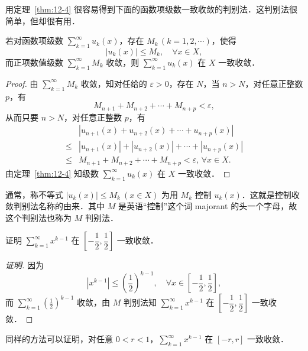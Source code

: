 用定理~\ref{thm:12-4} 很容易得到下面的函数项级数一致收敛的判别法．这判别法很简单，但却很有用．

\begin{theorem}\label{thm:12-6}
若对函数项级数 $\displaystyle\sum_{k=1}^{\infty}u_{k}(x)$，存在 $M_{k}\,(k=1,2,\cdots)$，使得
\[
\left|u_{k}(x)\right|\leqslant M_{k},\quad\forall x\in X,
\]
而正项数值级数 $\displaystyle\sum_{k=1}^{\infty}M_{k}$ 收敛，则 $\displaystyle\sum_{k=1}^{\infty}u_{k}(x)$ 在 $X$ 一致收敛．
\end{theorem}

\begin{proof}
由 $\displaystyle\sum_{k=1}^{\infty}M_{k}$ 收敛，知对任给的 $\varepsilon>0$，存在 $N$，当 $n>N$，对任意正整数 $p$，有
\[
M_{n+1}+M_{n+2}+\cdots+M_{n+p}<\varepsilon,
\]
从而只要 $n>N$，对任意正整数 $p$，有
\[
\begin{aligned}
&\left|u_{n+1}(x)+u_{n+2}(x)+\cdots+u_{n+p}(x)\right|\\
\leqslant{}&\left|u_{n+1}(x)\right|+\left|u_{n+2}(x)\right|+\cdots+\left|u_{n+p}(x)\right|\\
\leqslant{}&M_{n+1}+M_{n+2}+\cdots+M_{n+p}<\varepsilon,\,\forall x\in X.
\end{aligned}
\]
由定理~\ref{thm:12-4} 知级数 $\displaystyle\sum_{k=1}^{\infty}u_{k}(x)$ 在 $X$ 一致收敛．
\end{proof}

通常，称不等式 $\left|u_{k}(x)\right|\leqslant M_{k}\ (x\in X)$ 为用 $M_{k}$ 控制 $u_{k}(x)$．这就是控制收敛判别法名称的由来．其中 $M$ 是英语``控制''这个词 majorant 的头一个字母，故这个判别法也称为 $M$ 判别法．

\begin{example}\label{ex:12-2-6}
证明 $\displaystyle\sum_{k=1}^{\infty}x^{k-1}$ 在 $\left[-\dfrac{1}{2},\dfrac{1}{2}\right]$ 一致收敛．
\end{example}

\begin{proof}[证明]
因为
\[
\left|x^{k-1}\right|\leqslant\left(\frac{1}{2}\right)^{k-1},\quad\forall x\in\left[-\frac{1}{2},\frac{1}{2}\right],
\]
而 $\displaystyle\sum_{k=1}^{\infty}\left(\frac{1}{2}\right)^{k-1}$ 收敛，由 $M$ 判别法知 $\displaystyle\sum_{k=1}^{\infty}x^{k-1}$ 在 $\left[-\dfrac{1}{2},\dfrac{1}{2}\right]$ 一致收敛．
\end{proof}

同样的方法可以证明，对任意 $0<r<1$，$\displaystyle\sum_{k=1}^{\infty}x^{k-1}$ 在 $[-r,r]$ 一致收敛．

